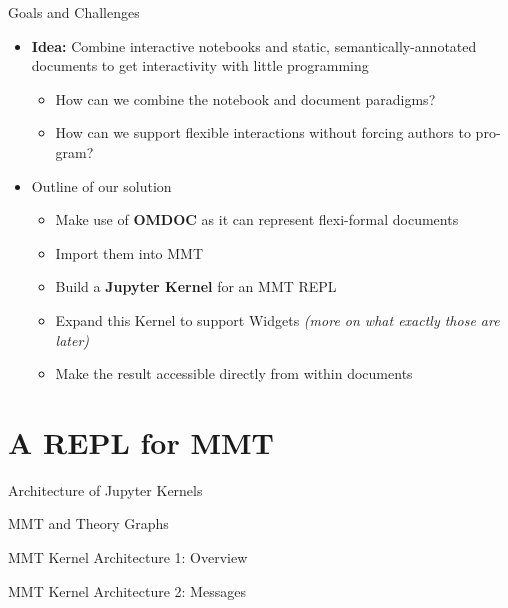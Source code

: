 \documentclass{beamer}
\begin{document}
    \begin{frame}{Goals and Challenges}
        \begin{itemize}
            \item \textbf{Idea:} Combine interactive notebooks and static, semantically-annotated documents to get interactivity with little programming
            \begin{itemize}
                \item How can we combine the notebook and document paradigms?
                \item How can we support flexible interactions without forcing authors to pro-
gram?
            \end{itemize}

            \item Outline of our solution
            \begin{itemize}
                \item Make use of \textbf{OMDOC} as it can represent flexi-formal documents
                \item Import them into MMT
                \item Build a \textbf{Jupyter Kernel} for an MMT REPL
                \item Expand this Kernel to support Widgets \textit{(more on what exactly those are later)}
                \item Make the result accessible directly from within documents
            \end{itemize}

        \end{itemize}
    \end{frame}

    \section{A REPL for MMT}

    \begin{frame}{Architecture of Jupyter Kernels}
    \end{frame}

    \begin{frame}{MMT and Theory Graphs}
    \end{frame}

    \begin{frame}{MMT Kernel Architecture 1: Overview}
    \end{frame}

    \begin{frame}{MMT Kernel Architecture 2: Messages}
    \end{frame}
\end{document}
